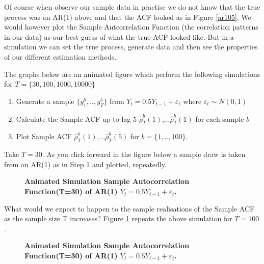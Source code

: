 \documentclass[openany]{tufte-book} %
\begin{document}
Of course when observe our sample data in practise we do  not know that the true process was an AR(1) above and that the ACF looked as in Figure \ref{ar105}. We would however plot the Sample Autcorrelation Function (the correlation patterns in our data) as our best guess of what the true ACF looked like. But in a simulation we can set the true process, generate data and then see the properties of our different estimation methods.

 The graphs below are  an animated figure which perform the following simulations for $T=\{30,100,1000,10000\}$

\begin{enumerate}	
\item Generate a sample $\{y_1^b,..,y_T^b\}$ from $Y_t=0.5Y_{t-1} +\varepsilon_t$ where $\varepsilon_t \sim N(0,1)$

\item Calculate the Sample ACF up to lag 5 $\hat{\rho}_{T}^b(1)$,..,$\hat{\rho}_{T}^b(1)$	for each sample $b$   




\item	Plot  Sample ACF  $\hat{\rho}_{T}^b(1)$,..,$\hat{\rho}_{T}^b(5)$   for  $b=\{1,..,100\}$.

\end{enumerate}


Take $T=30$. As you click forward in the figure below a sample draw is taken from an AR(1) as in Step 1 and plotted, repeatedly. 
\begin{figure}
\caption[Animated Simulation Sample Autocorrelation Function (T=100) of AR(1)  ]{\textbf{Animated Simulation Sample Autocorrelation Function(T=30) of AR(1) $Y_t=0.5Y_{t-1} +\varepsilon_t$. }}

\end{figure}

What would we expect to happen to the sample realisations of the Sample ACF as the sample size T increases? Figure \ref{ar2} repeats the above simulation for $T=100$.

\begin{figure} \label{ar2}
	\caption[Animated Simulation Sample Autocorrelation Function (T=1000) of AR(1)  ]{\textbf{Animated Simulation Sample Autocorrelation Function(T=30) of AR(1) $Y_t=0.5Y_{t-1} +\varepsilon_t$. }}
	
\end{figure}
\end{document}
